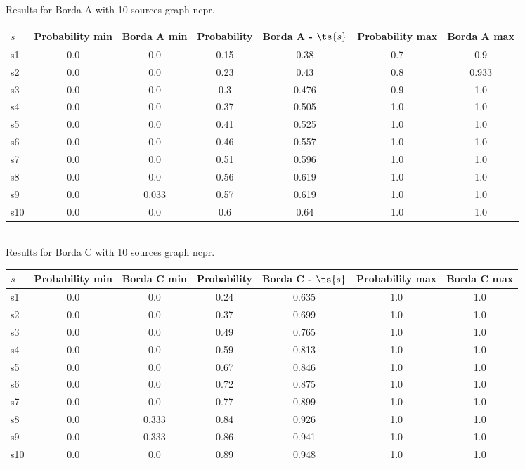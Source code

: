 \documentclass{article}
\begin{document}
\noindent Results for Borda A with 10 sources graph ncpr.

\noindent\begin{tabular}{|l|c|c|c|c|c|c|}
\hline
$s$& Probability min & Borda A min & Probability & Borda A - $\ts{s}$ & Probability max & Borda A max\\
\hline
s1 &0.0 & 0.0 & 0.15 & 0.38 & 0.7 & 0.9\\
\hline
s2 &0.0 & 0.0 & 0.23 & 0.43 & 0.8 & 0.933\\
\hline
s3 &0.0 & 0.0 & 0.3 & 0.476 & 0.9 & 1.0\\
\hline
s4 &0.0 & 0.0 & 0.37 & 0.505 & 1.0 & 1.0\\
\hline
s5 &0.0 & 0.0 & 0.41 & 0.525 & 1.0 & 1.0\\
\hline
s6 &0.0 & 0.0 & 0.46 & 0.557 & 1.0 & 1.0\\
\hline
s7 &0.0 & 0.0 & 0.51 & 0.596 & 1.0 & 1.0\\
\hline
s8 &0.0 & 0.0 & 0.56 & 0.619 & 1.0 & 1.0\\
\hline
s9 &0.0 & 0.033 & 0.57 & 0.619 & 1.0 & 1.0\\
\hline
s10 &0.0 & 0.0 & 0.6 & 0.64 & 1.0 & 1.0\\
\hline
\end{tabular}\\

\noindent Results for Borda C with 10 sources graph ncpr.

\noindent\begin{tabular}{|l|c|c|c|c|c|c|}
\hline
$s$& Probability min & Borda C min & Probability & Borda C - $\ts{s}$ & Probability max & Borda C max\\
\hline
s1 &0.0 & 0.0 & 0.24 & 0.635 & 1.0 & 1.0\\
\hline
s2 &0.0 & 0.0 & 0.37 & 0.699 & 1.0 & 1.0\\
\hline
s3 &0.0 & 0.0 & 0.49 & 0.765 & 1.0 & 1.0\\
\hline
s4 &0.0 & 0.0 & 0.59 & 0.813 & 1.0 & 1.0\\
\hline
s5 &0.0 & 0.0 & 0.67 & 0.846 & 1.0 & 1.0\\
\hline
s6 &0.0 & 0.0 & 0.72 & 0.875 & 1.0 & 1.0\\
\hline
s7 &0.0 & 0.0 & 0.77 & 0.899 & 1.0 & 1.0\\
\hline
s8 &0.0 & 0.333 & 0.84 & 0.926 & 1.0 & 1.0\\
\hline
s9 &0.0 & 0.333 & 0.86 & 0.941 & 1.0 & 1.0\\
\hline
s10 &0.0 & 0.0 & 0.89 & 0.948 & 1.0 & 1.0\\
\hline
\end{tabular}\\
\end{document}
